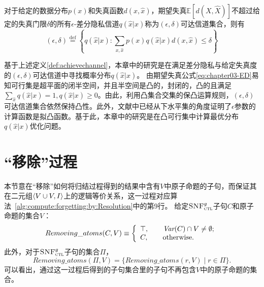 \begin{definition}\label{def:achievechannel}对于给定的数据分布$p(x)$和失真函数$d(x,\hat{x})$，期望失真$\mathbb{E}\left[d(X,\hat{X})\right]$不超过给定的失真门限$\delta$的所有$\epsilon$-差分隐私信道$q(\hat{x}|x)$称为$(\epsilon,\delta)$可达信道集合，则有
	\begin{equation}
		(\epsilon,\delta)\stackrel{\text{def}}{=} \left\{q(\hat{x}|x):\sum_{x,\hat{x}}p(x)q(\hat{x}|x)d(x,\hat{x})\leq \delta\right\}
	\end{equation}
\end{definition}

基于上述定义\ref{def:achievechannel}，本章中的研究是在满足差分隐私与给定失真度的$(\epsilon,\delta)$可达信道中寻找概率分布$q(\hat{x}|x)$。 由期望失真公式\ref{eq:chapter03-ED}易知可行集是超平面的闭半空间，并且半空间是凸的\cite{boyd2004convex}，封闭的，凸的且满足$\sum_{\hat{x}}q(\hat{x}|x)=1, q(\hat{x}|x)\geq 0$。由此，利用凸集合交集的保凸运算规则，$(\epsilon,\delta)$可达信道集合依然保持凸性。此外，文献中已经从下水平集的角度证明了$\epsilon$参数的计算函数是拟凸函数。基于此，本章中的研究是在凸可行集中计算最优分布$q(\hat{x}|x)$优化问题。

\section{“移除”过程}
本节意在“移除”如何将归结过程得到的结果中含有$V$中原子命题的子句，而保证其在二元组${\langle{V\cup V, I}\rangle}$上的逻辑等价关系，这一过程对应算法~\ref{alg:compute:forgetting:by:Resolution}中的第9行。
给定${\textsc{SNF}_{\textsc{ctl}}^g}$子句$C$和原子命题的集合$V$：
\[Removing\_atoms(C, V) \equiv
\left\{
\begin{array}{ll}
	\top, \qquad \hbox{$\textit{Var}(C) \cap V \not = \emptyset$;} \\
	C,  \qquad  \hbox{otherwise.}
\end{array}
\right.
\]
此外，对于${\textsc{SNF}_{\textsc{ctl}}^g}$子句的集合$\Pi$，
\[Removing\_atoms(\Pi, V) = \{Removing\_atoms(r, V) \mid r \in \Pi\}.\]
可以看出，通过这一过程后得到的子句集合里的子句不再包含$V$中的原子命题的集合。

